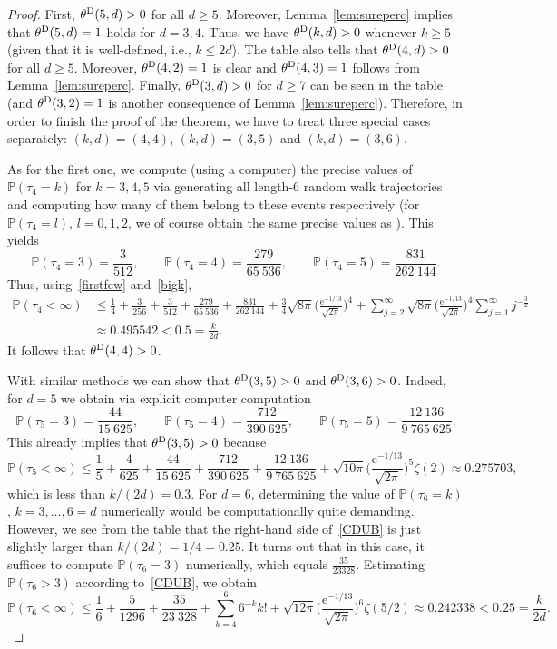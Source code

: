\documentclass{article}
\newcommand{\e}{\mathrm e}
\theoremstyle{definition}
\renewcommand{\P}{\mathbb{P}}
\newcommand{\1}{\mathbbm{1}}
\newcommand{\0}{\mathbf{o}}
\begin{document}
\begin{proof}
First, $\theta^{\rm D}(5,d) >0$ for all $d \geq 5$. Moreover, Lemma~\ref{lem:sureperc} implies that $\theta^{\rm D}(5,d)=1$ holds for $d=3,4$. Thus, we have $\theta^{\rm D}(k,d) >0$ whenever $k\geq 5$ (given that it is well-defined, i.e., $k\leq 2d$). The table also tells that  $\theta^{\rm D}(4,d)>0$ for all $d \geq 5$. Moreover, $\theta^{\rm D}(4,2)=1$ is clear and $\theta^{\rm D}(4,3)=1$ follows from Lemma~\ref{lem:sureperc}. Finally, $\theta^{\rm D}(3,d)>0$ for $d \geq 7$ can be seen in the table (and $\theta^{\rm D}(3,2)=1$ is another consequence of Lemma~\ref{lem:sureperc}). Therefore, in order to finish the proof of the theorem, we have to treat three special cases separately: $(k,d)=(4,4)$, $(k,d)=(3,5)$ and $(k,d)=(3,6)$. 

As for the first one, we compute (using a computer) the precise values of $\P(\tau_4=k)$ for $k=3,4,5$ via generating all length-6 random walk trajectories and computing how many of them belong to these events respectively (for $\P(\tau_4=l)$, $l=0,1,2$, we of course obtain the same precise values as \cite{CoxDurrett}). This yields
\[ \P(\tau_4=3)=\frac{3}{512}, \qquad \P(\tau_4=4)=\frac{279}{65\ 536}, \qquad \P(\tau_4=5)=\frac{831}{262\ 144}. \]
Thus, using~\eqref{firstfew} and~\eqref{bigk},
\[ \begin{aligned} \P(\tau_4<\infty) & \leq \frac{1}{4} + \frac{3}{256} + \frac{3}{512} + \frac{279}{65\ 536} + \frac{831}{262\ 144} + \frac{3}{4} \sqrt{8\pi} \Big( \frac{\e^{-1/13}}{\sqrt{2\pi}} \Big)^4 + \sum_{j=2}^{\infty} \sqrt{8\pi} \Big( \frac{\e^{-1/13}}{\sqrt{2\pi}} \Big)^4 \sum_{j=1}^{\infty} j^{-\frac{3}{2}} \\ & \approx 0.495542 < 0.5 = \frac{k}{2d}. \end{aligned}\]
It follows that $\theta^{\rm D}(4,4)>0$.

With similar methods we can show that $\theta^{\rm D}(3,5)>0$ and $\theta^{\rm D}(3,6)>0$. Indeed, for $d=5$ we obtain via explicit computer computation
\[ \P(\tau_5=3)=\frac{44}{15\ 625}, \qquad \P(\tau_5=4)=\frac{712}{390\  625}, \qquad \P(\tau_5=5)=\frac{12\ 136}{9\ 765\ 625}. \]
This already implies that  $\theta^{\rm D}(3,5)>0$ because
\[ \P(\tau_5<\infty) \leq \frac{1}{5} + \frac{4}{625} + \frac{44}{15\ 625} + \frac{712}{390\  625} + \frac{12\ 136}{9\ 765\ 625} + \sqrt{10\pi} \Big( \frac{\e^{-1/13}}{\sqrt{2\pi}} \Big)^5 \zeta(2) \approx 0.275703, \]
which is less than $k/(2d)=0.3$. For $d=6$, determining the value of $\P(\tau_6=k)$, $k=3,\ldots,6=d$ numerically would be computationally quite demanding. However, we see from the table that the right-hand side of~\eqref{CDUB} is just slightly larger than $k/(2d)=1/4=0.25$. It turns out that in this case, it suffices to compute $\P(\tau_6=3)$ numerically, which equals $\frac{35}{23328}$. Estimating $\P(\tau_6>3)$ according to~\eqref{CDUB}, we obtain
\[ \P(\tau_6<\infty) \leq \frac{1}{6} + \frac{5}{1296} + \frac{35}{23\ 328} + \sum_{k=4}^6 6^{-k} k! + \sqrt{12\pi} \Big( \frac{\e^{-1/13}}{\sqrt{2\pi}} \Big)^6 \zeta(5/2) \approx 0.242338 < 0.25=\frac{k}{2d}. \]
\end{proof}
\end{document}
